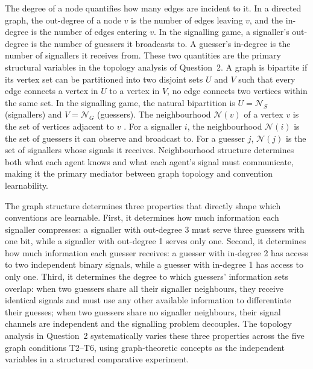 \documentclass[a4paper,twoside,12pt]{report}
\begin{document}
    
    The degree of a node quantifies how many edges are incident to it. In a
    directed graph, the out-degree of a node $v$ is the number
    of edges leaving $v$, and the in-degree is the number of
    edges entering $v$. In the signalling game, a signaller's out-degree is the number of guessers it broadcasts to. A guesser's in-degree is the number of signallers it receives from. These two quantities are the primary structural
    variables in the topology analysis of Question~2. A graph is bipartite if its vertex set can be partitioned into two
    disjoint sets $U$ and $V$ such that every edge connects a vertex in $U$ to a
    vertex in $V$, no edge connects two vertices within the same set. In the signalling game, the natural bipartition is
    $U = \mathcal{N}_S$ (signallers) and $V = \mathcal{N}_G$ (guessers). The neighbourhood $\mathcal{N}(v)$ of a vertex $v$ is the set of
    vertices adjacent to $v$ \citep{diestel2017}. For a signaller $i$, the
    neighbourhood $\mathcal{N}(i)$ is the set of guessers it can observe and
    broadcast to. For a guesser $j$, $\mathcal{N}(j)$ is the set of signallers
    whose signals it receives. Neighbourhood structure determines both what each
    agent knows and what each agent's signal must communicate, making it the
    primary mediator between graph topology and convention learnability.
     
    
    
    The graph structure determines three properties that directly shape which
    conventions are learnable. First, it determines how much information each
    signaller compresses: a signaller with out-degree 3 must serve three guessers
    with one bit, while a signaller with out-degree 1 serves only one. Second, it
    determines how much information each guesser receives: a guesser with in-degree
    2 has access to two independent binary signals, while a guesser with in-degree
    1 has access to only one. Third, it determines the degree to which guessers'
    information sets overlap: when two guessers share all their signaller neighbours,
    they receive identical signals and must use any other available information to
    differentiate their guesses; when two guessers share no signaller neighbours,
    their signal channels are independent and the signalling problem decouples. The
    topology analysis in Question~2 systematically varies these three properties
    across the five graph conditions T2--T6, using graph-theoretic concepts as the
    independent variables in a structured comparative experiment.
    
\end{document}
